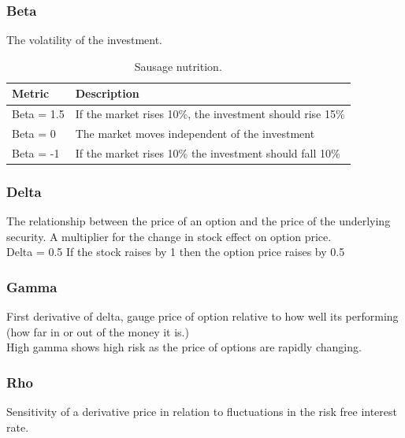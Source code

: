 \documentclass[11pt]{scrartcl} %
\begin{document}
\subsubsection{Beta}

The volatility of the investment.

\begin{table}[h] %
	\centering %
	\begin{tabular}{l l}
		\toprule
		\textbf{Metric} & \textbf{Description} \\
		\midrule
		Beta = 1.5 & If the market rises 10\%, the investment should rise 15\% \\
		Beta = 0 & The market moves independent of the investment \\
		Beta = -1 & If the market rises 10\% the investment should fall 10\%\\ 
		\bottomrule
	\end{tabular}
	\caption{Sausage nutrition.}
\end{table}

\subsubsection{Delta}

The relationship between the price of an option and the price of the underlying security. A multiplier for the change in stock effect on option price.\\

Delta = 0.5 If the stock raises by 1 then the option price raises by 0.5 

\subsubsection{Gamma}

First derivative of delta, gauge price of option relative to how well its performing (how far in or out of the money it is.)\\

High gamma shows high risk as the price of options are rapidly changing.

\subsubsection{Rho}

Sensitivity of a derivative price in relation to fluctuations in the risk free interest rate.\\
\end{document}
